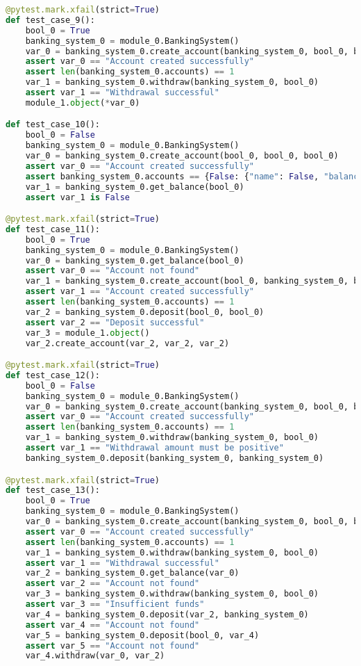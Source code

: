 \documentclass{article}
\begin{document}
\begin{lstlisting}[language=Python]
@pytest.mark.xfail(strict=True)
def test_case_9():
    bool_0 = True
    banking_system_0 = module_0.BankingSystem()
    var_0 = banking_system_0.create_account(banking_system_0, bool_0, bool_0)
    assert var_0 == "Account created successfully"
    assert len(banking_system_0.accounts) == 1
    var_1 = banking_system_0.withdraw(banking_system_0, bool_0)
    assert var_1 == "Withdrawal successful"
    module_1.object(*var_0)

def test_case_10():
    bool_0 = False
    banking_system_0 = module_0.BankingSystem()
    var_0 = banking_system_0.create_account(bool_0, bool_0, bool_0)
    assert var_0 == "Account created successfully"
    assert banking_system_0.accounts == {False: {"name": False, "balance": False}}
    var_1 = banking_system_0.get_balance(bool_0)
    assert var_1 is False

@pytest.mark.xfail(strict=True)
def test_case_11():
    bool_0 = True
    banking_system_0 = module_0.BankingSystem()
    var_0 = banking_system_0.get_balance(bool_0)
    assert var_0 == "Account not found"
    var_1 = banking_system_0.create_account(bool_0, banking_system_0, bool_0)
    assert var_1 == "Account created successfully"
    assert len(banking_system_0.accounts) == 1
    var_2 = banking_system_0.deposit(bool_0, bool_0)
    assert var_2 == "Deposit successful"
    var_3 = module_1.object()
    var_2.create_account(var_2, var_2, var_2)

@pytest.mark.xfail(strict=True)
def test_case_12():
    bool_0 = False
    banking_system_0 = module_0.BankingSystem()
    var_0 = banking_system_0.create_account(banking_system_0, bool_0, bool_0)
    assert var_0 == "Account created successfully"
    assert len(banking_system_0.accounts) == 1
    var_1 = banking_system_0.withdraw(banking_system_0, bool_0)
    assert var_1 == "Withdrawal amount must be positive"
    banking_system_0.deposit(banking_system_0, banking_system_0)

@pytest.mark.xfail(strict=True)
def test_case_13():
    bool_0 = True
    banking_system_0 = module_0.BankingSystem()
    var_0 = banking_system_0.create_account(banking_system_0, bool_0, bool_0)
    assert var_0 == "Account created successfully"
    assert len(banking_system_0.accounts) == 1
    var_1 = banking_system_0.withdraw(banking_system_0, bool_0)
    assert var_1 == "Withdrawal successful"
    var_2 = banking_system_0.get_balance(var_0)
    assert var_2 == "Account not found"
    var_3 = banking_system_0.withdraw(banking_system_0, bool_0)
    assert var_3 == "Insufficient funds"
    var_4 = banking_system_0.deposit(var_2, banking_system_0)
    assert var_4 == "Account not found"
    var_5 = banking_system_0.deposit(bool_0, var_4)
    assert var_5 == "Account not found"
    var_4.withdraw(var_0, var_2)
\end{lstlisting}

\hspace{0cm}
\newpage



\end{document}
